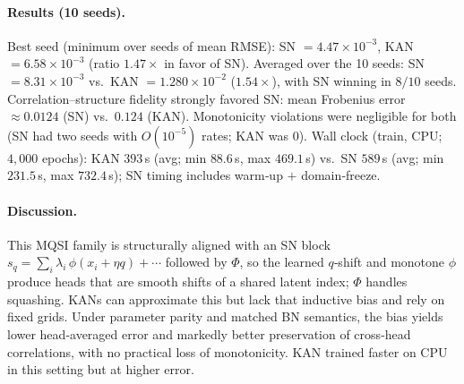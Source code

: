\documentclass{article}
\theoremstyle{plain}
\theoremstyle{definition}
\theoremstyle{remark}
\begin{document}
\paragraph{Results (10 seeds).}
Best seed (minimum over seeds of mean RMSE): SN $=4.47\times 10^{-3}$, KAN $=6.58\times 10^{-3}$ (ratio $1.47\times$ in favor of SN). Averaged over the 10 seeds: SN $=8.31\times 10^{-3}$ vs.\ KAN $=1.280\times 10^{-2}$ ($1.54\times$), with SN winning in $8/10$ seeds. Correlation–structure fidelity strongly favored SN: mean Frobenius error $\approx 0.0124$ (SN) vs.\ $0.124$ (KAN). Monotonicity violations were negligible for both (SN had two seeds with $O(10^{-5})$ rates; KAN was $0$). Wall clock (train, CPU; $4{,}000$ epochs): KAN $393$\,s (avg; min $88.6$\,s, max $469.1$\,s) vs.\ SN $589$\,s (avg; min $231.5$\,s, max $732.4$\,s); SN timing includes warm‑up $+$ domain‑freeze.

\paragraph{Discussion.}
This MQSI family is structurally aligned with an SN block $s_q=\sum_i \lambda_i\,\phi(x_i+\eta q)+\cdots$ followed by $\Phi$, so the learned $q$‑shift and monotone $\phi$ produce heads that are smooth shifts of a shared latent index; $\Phi$ handles squashing. KANs can approximate this but lack that inductive bias and rely on fixed grids. Under parameter parity and matched BN semantics, the bias yields lower head‑averaged error and markedly better preservation of cross‑head correlations, with no practical loss of monotonicity. KAN trained faster on CPU in this setting but at higher error.
\end{document}

